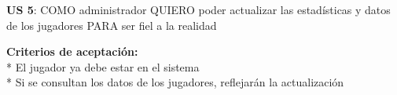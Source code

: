 \begin{tcolorbox}
\textbf{US 5}: COMO administrador QUIERO poder actualizar las estadísticas y datos de los jugadores PARA ser fiel a la realidad

\vline

\textbf{Criterios de aceptación:}\\
* El jugador ya debe estar en el sistema \\
* Si se consultan los datos de los jugadores, reflejarán la actualización \\
\end{tcolorbox}
\vspace{10pt}





